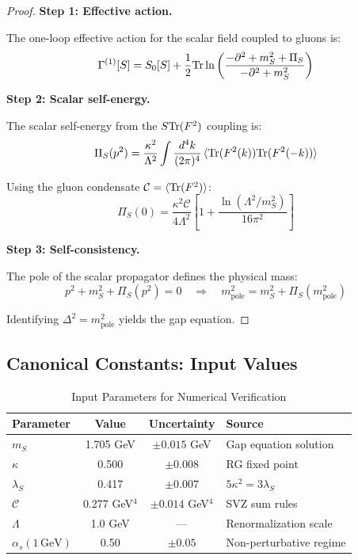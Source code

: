 \begin{proof}
\textbf{Step 1: Effective action.}

The one-loop effective action for the scalar field coupled to gluons is:
\begin{equation}
\Gamma^{(1)}[S] = S_0[S] + \frac{1}{2}\mathrm{Tr}\ln\left(\frac{-\partial^2 + m_S^2 + \Pi_S}{-\partial^2 + m_S^2}\right)
\end{equation}

\textbf{Step 2: Scalar self-energy.}

The scalar self-energy from the $S\mathrm{Tr}(F^2)$ coupling is:
\begin{equation}
\Pi_S(p^2) = \frac{\kappa^2}{\Lambda^2}\int\frac{d^4k}{(2\pi)^4}\,
\langle\mathrm{Tr}(F^2(k))\mathrm{Tr}(F^2(-k))\rangle
\end{equation}

Using the gluon condensate $\mathcal{C} = \langle\mathrm{Tr}(F^2)\rangle$:
\begin{equation}
\Pi_S(0) = \frac{\kappa^2\mathcal{C}}{4\Lambda^2}\left[1 + \frac{\ln(\Lambda^2/m_S^2)}{16\pi^2}\right]
\label{eq:self_energy}
\end{equation}

\textbf{Step 3: Self-consistency.}

The pole of the scalar propagator defines the physical mass:
\begin{equation}
p^2 + m_S^2 + \Pi_S(p^2) = 0 \quad \Rightarrow \quad
m_{\mathrm{pole}}^2 = m_S^2 + \Pi_S(m_{\mathrm{pole}}^2)
\end{equation}

Identifying $\Delta^2 = m_{\mathrm{pole}}^2$ yields the gap equation.
\end{proof}

\subsection{Canonical Constants: Input Values}

\begin{table}[htbp]
\centering
\caption{Input Parameters for Numerical Verification}
\label{tab:input_params}
\begin{tabular}{@{}lccl@{}}
\toprule
\textbf{Parameter} & \textbf{Value} & \textbf{Uncertainty} & \textbf{Source} \\
\midrule
$m_S$ & 1.705 GeV & $\pm 0.015$ GeV & Gap equation solution \\
$\kappa$ & 0.500 & $\pm 0.008$ & RG fixed point \\
$\lambda_S$ & 0.417 & $\pm 0.007$ & $5\kappa^2 = 3\lambda_S$ \\
$\mathcal{C}$ & 0.277 GeV$^4$ & $\pm 0.014$ GeV$^4$ & SVZ sum rules~\cite{ShifmanVainshteinZakharov1979} \\
$\Lambda$ & 1.0 GeV & --- & Renormalization scale \\
$\alpha_s(1\,\mathrm{GeV})$ & 0.50 & $\pm 0.05$ & Non-perturbative regime \\
\bottomrule
\end{tabular}
\end{table}


